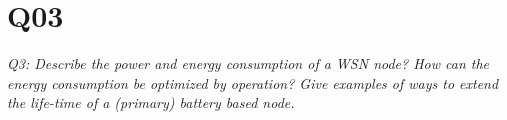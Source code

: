 \chapter{Q03}
\emph{Q3: Describe the power and energy consumption of a WSN node? How can the
energy consumption be optimized by operation? Give examples of ways to extend
the life-time of a (primary) battery based node.}
